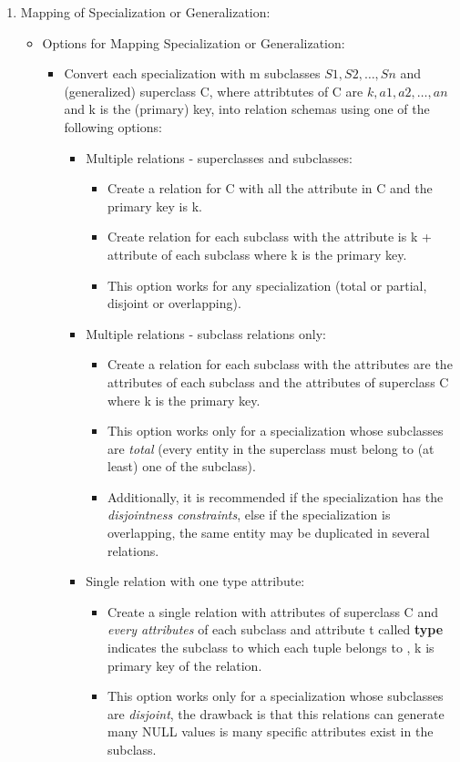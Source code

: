 \documentclass[10pt]{article}
\begin{document}
\begin{enumerate}
	\item Mapping of Specialization or Generalization: 
	\begin{itemize}
		\item Options for Mapping Specialization or Generalization:
		\begin{itemize}
			\item Convert each specialization with m subclasses ${S1, S2, \dots, Sn}$ and (generalized) superclass C, where attribtutes of C are ${k, a1, a2, \dots, an}$ and k is the (primary) key, into relation schemas using one of the following options:
			\begin{itemize}
				\item Multiple relations - superclasses and subclasses:
				\begin{itemize}
					\item Create a relation for C with all the attribute in C and the primary key is k.
					\item Create relation for each subclass with the attribute is k + attribute of each subclass where k is the primary key.
					\item This option works for any specialization (total or partial, disjoint or overlapping). 
				\end{itemize}

				\item Multiple relations - subclass relations only:
				\begin{itemize}
					\item Create a relation for each subclass with the attributes are the attributes of each subclass and the attributes of superclass C where k is the primary key.
					\item This option works only for a specialization whose subclasses are \textit{total} (every entity in the superclass must belong to (at least) one of the subclass).
					\item Additionally, it is recommended if the specialization has the \textit{disjointness constraints}, else if the specialization is overlapping, the same entity may be duplicated in several relations.
				\end{itemize}

				\item Single relation with one type attribute:
				\begin{itemize}
					\item Create a single relation with attributes of superclass C and \textit{every attributes} of each subclass and attribute t called \textbf{type} indicates the subclass to which each tuple belongs to , k is primary key of the relation.
					\item This option works only for a specialization whose subclasses are \textit{disjoint}, the drawback is that this relations can generate many NULL values is many specific attributes exist in the subclass. 
				\end{itemize}


\end{itemize}
\end{itemize}
\end{itemize}
\end{enumerate}
\end{document}
